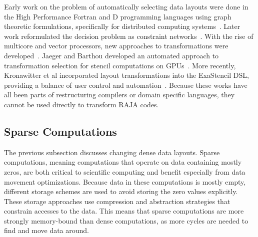 Early work on the problem of automatically selecting data layouts were done in the High Performance Fortran and D programming languages using graph theoretic formulations, specifically for distributed computing systems~\cite{kennedy1995automatic,kennedy1998automatic}.
Later work reformulated the decision problem as constraint networks~\cite{chen2005constraint}.
With the rise of multicore and vector processors, new approaches to transformations were developed~\cite{lu2009data,henretty2011data,zhang2011optimizing}.
Jaeger and Barthou developed an automated approach to transformation selection for stencil computations on GPUs~\cite{jaeger2012automatic}.
More recently, Kronawitter et al incorporated layout transformations into the ExaStencil DSL, providing a balance of user control and automation~\cite{kronawitter2018automatic}.
Because these works have all been parts of restructuring compilers or domain specific languages, they cannot be used directly to transform RAJA codes.

\subsection{Sparse Computations}

The previous subsection discusses changing dense data layouts.
Sparse computations, meaning computations that operate on data containing mostly zeros, are both critical to scientific computing and benefit especially from data movement optimizations.
Because data in these computations is mostly empty, different storage schemes are used to avoid storing the zero values explicitly. 
These storage approaches use compression and abstraction strategies that constrain accesses to the data.
This means that sparse computations are more strongly memory-bound than dense computations, as more cycles are needed to find and move data around.

